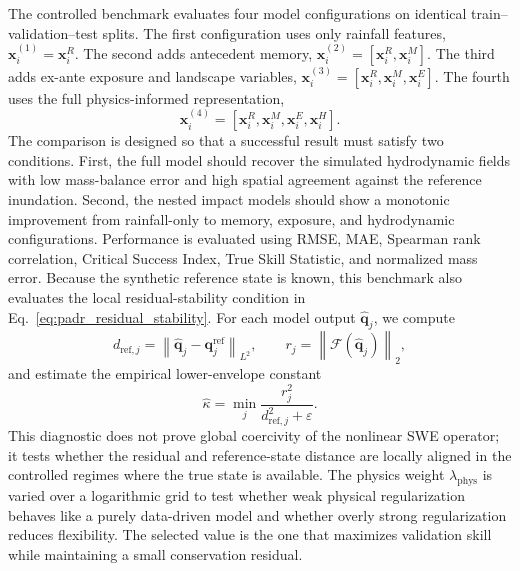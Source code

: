 \documentclass[pdflatex,sn-mathphys-ay]{sn-jnl}
\theoremstyle{thmstyleone}
\begin{document}
The controlled benchmark evaluates four model configurations on
identical train--validation--test splits.  The first configuration uses
only rainfall features, $\mathbf{x}^{(1)}_i=\mathbf{x}^{R}_i$.  The
second adds antecedent memory,
$\mathbf{x}^{(2)}_i=[\mathbf{x}^{R}_i,\mathbf{x}^{M}_i]$.  The third
adds ex-ante exposure and landscape variables,
$\mathbf{x}^{(3)}_i=
[\mathbf{x}^{R}_i,\mathbf{x}^{M}_i,\mathbf{x}^{E}_i]$.  The fourth
uses the full physics-informed representation,
\begin{equation}
  \mathbf{x}^{(4)}_i
  =
  [
    \mathbf{x}^{R}_i,
    \mathbf{x}^{M}_i,
    \mathbf{x}^{E}_i,
    \mathbf{x}^{H}_i
  ].
  \label{eq:synthetic_nested_models}
\end{equation}
The comparison is designed so that a successful result must satisfy
two conditions.  First, the full model should recover the simulated
hydrodynamic fields with low mass-balance error and high spatial
agreement against the reference inundation.  Second, the nested impact
models should show a monotonic improvement from rainfall-only to
memory, exposure, and hydrodynamic configurations.  Performance is
evaluated using RMSE, MAE, Spearman rank correlation, Critical Success
Index, True Skill Statistic, and normalized mass error.  Because the
synthetic reference state is known, this benchmark also evaluates the
local residual-stability condition in Eq.~\eqref{eq:padr_residual_stability}.
For each model output $\hat{\mathbf{q}}_j$, we compute
\begin{equation}
  d_{\mathrm{ref},j}
  =
  \left\|
    \hat{\mathbf{q}}_j
    -
    \mathbf{q}^{\mathrm{ref}}_j
  \right\|_{L^2},
  \qquad
  r_j
  =
  \left\|
    \mathcal{F}
    \left(
      \hat{\mathbf{q}}_j
    \right)
  \right\|_2,
  \label{eq:residual_stability_diagnostic}
\end{equation}
and estimate the empirical lower-envelope constant
\begin{equation}
  \widehat{\kappa}
  =
  \min_j
  \frac{
    r_j^2
  }{
    d_{\mathrm{ref},j}^{2}+\varepsilon
  }.
  \label{eq:kappa_hat}
\end{equation}
This diagnostic does not prove global coercivity of the nonlinear SWE
operator; it tests whether the residual and reference-state distance
are locally aligned in the controlled regimes where the true state is
available.  The physics
weight $\lambda_{\mathrm{phys}}$ is varied over a logarithmic grid to
test whether weak physical regularization behaves like a purely
data-driven model and whether overly strong regularization reduces
flexibility.  The selected value is the one that maximizes validation
skill while maintaining a small conservation residual.
\end{document}
